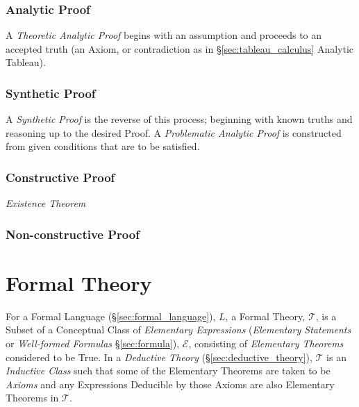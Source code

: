 \subsubsection{Analytic Proof} \label{sec:analytic_proof}

A \emph{Theoretic Analytic Proof} begins with an assumption and
proceeds to an accepted truth (an Axiom, or contradiction as in
\S\ref{sec:tableau_calculus} Analytic Tableau).



\subsubsection{Synthetic Proof} \label{sec:synthetic_proof}

A \emph{Synthetic Proof} is the reverse of this process; beginning
with known truths and reasoning up to the desired Proof. A
\emph{Problematic Analytic Proof} is constructed from given conditions
that are to be satisfied.



\subsubsection{Constructive Proof}\label{sec:constructive_proof}

\emph{Existence Theorem}



\subsubsection{Non-constructive Proof}\label{sec:nonconstructive_proof}



\section{Formal Theory}\label{sec:formal_theory}

For a Formal Language (\S\ref{sec:formal_language}), $L$, a Formal
Theory, $\mathcal{T}$, is a Subset of a Conceptual Class of
\emph{Elementary Expressions} (\emph{Elementary Statements} or
\emph{Well-formed Formulas} \S\ref{sec:formula}), $\mathcal{E}$,
consisting of \emph{Elementary Theorems} considered to be True. In a
\emph{Deductive Theory} (\S\ref{sec:deductive_theory}), $\mathcal{T}$
is an \emph{Inductive Class} such that some of the Elementary Theorems
are taken to be \emph{Axioms} and any Expressions Deducible by those
Axioms are also Elementary Theorems in $\mathcal{T}$.



